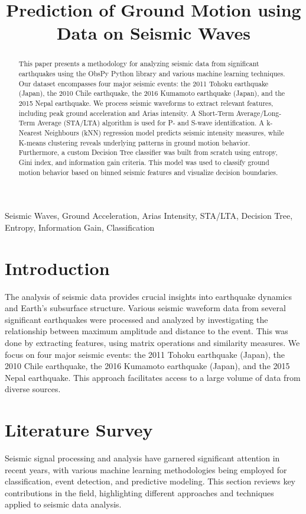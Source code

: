 \documentclass[conference]{IEEEtran}
\date{}
\title{Prediction of Ground Motion using Data on Seismic Waves}
\begin{document}
\maketitle
\begin{abstract}
This paper presents a methodology for analyzing seismic data from significant
earthquakes using the ObsPy Python library and various machine learning
techniques. Our dataset encompasses four major seismic events: the 2011 Tohoku
earthquake (Japan), the 2010 Chile earthquake, the 2016 Kumamoto earthquake
(Japan), and the 2015 Nepal earthquake. We process seismic waveforms to extract
relevant features, including peak ground acceleration and Arias intensity. A
Short-Term Average/Long-Term Average (STA/LTA) algorithm is used for P- and
S-wave identification. A k-Nearest Neighbours (kNN) regression model predicts
seismic intensity measures, while K-means clustering reveals underlying patterns
in ground motion behavior. Furthermore, a custom Decision Tree classifier was
built from scratch using entropy, Gini index, and information gain criteria.
This model was used to classify ground motion behavior based on binned seismic
features and visualize decision boundaries.


\end{abstract}


\begin{IEEEkeywords}

Seismic Waves, Ground Acceleration, Arias Intensity, STA/LTA, Decision Tree, Entropy, Information Gain, Classification

\end{IEEEkeywords}
\section{Introduction}
\label{sec:orga811733}
The analysis of seismic data provides crucial insights into earthquake dynamics
and Earth's subsurface structure. Various seismic waveform data from several
significant earthquakes were processed and analyzed by investigating the
relationship between maximum amplitude and distance to the event. This was done
by extracting features, using matrix operations and similarity measures. We
focus on four major seismic events: the 2011 Tohoku earthquake (Japan), the 2010
Chile earthquake, the 2016 Kumamoto earthquake (Japan), and the 2015 Nepal
earthquake. This approach facilitates access to a large volume of data from
diverse sources.
\section{Literature Survey}
\label{sec:org8748b0e}
Seismic signal processing and analysis have garnered significant attention in
recent years, with various machine learning methodologies being employed for
classification, event detection, and predictive modeling. This section reviews
key contributions in the field, highlighting different approaches and techniques
applied to seismic data analysis.
\end{document}
